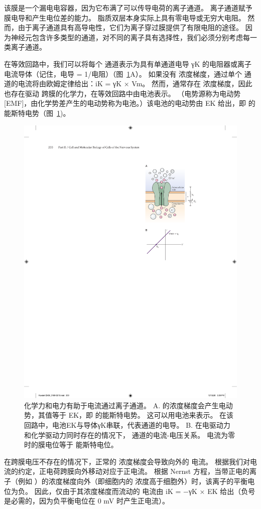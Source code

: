 该膜是一个漏电电容器，因为它布满了可以传导电荷的离子通道。
离子通道赋予膜电导和产生电位差的能力。
脂质双层本身实际上具有零电导或无穷大电阻。
然而，由于离子通道具有高导电性，它们为离子穿过膜提供了有限电阻的途径。
因为神经元包含许多类型的通道，对不同的离子具有选择性，我们必须分别考虑每一类离子通道。


在等效回路中，我们可以将每个  通道表示为具有单通道电导 γK 的电阻器或离子电流导体（记住，电导 = 1/电阻）（图~\ref{fig:9_6}A）。 
如果没有  浓度梯度，通过单个  通道的电流将由欧姆定律给出：iK = γK × Vm。
然而，通常存在  浓度梯度，因此也存在驱动  跨膜的化学力，在等效回路中由电池表示。
（电势源称为电动势 [EMF]，由化学势差产生的电动势称为电池。）该电池的电动势由 EK 给出，即  的能斯特电势（图~\ref{fig:9_6})。


\begin{figure}[htbp]
	\centering
	\includegraphics[width=0.5\linewidth]{chap09/fig_9_6}
	\caption{化学力和电力有助于电流通过离子通道。 A.  的浓度梯度会产生电动势，其值等于 EK，即  的能斯特电势。 这可以用电池来表示。 在该回路中，电池EK与导体γK串联，代表通道的电导。 B. 在电驱动力和化学驱动力同时存在的情况下， 通道的电流-电压关系。 电流为零时的膜电位等于  能斯特电位。}
	\label{fig:9_6}
\end{figure}


在跨膜电压不存在的情况下，正常的  浓度梯度会导致向外的  电流。
根据我们对电流的约定，正电荷跨膜向外移动对应于正电流。
根据 Nernst 方程，当带正电的离子（例如 ）的浓度梯度向外（即细胞内的  浓度高于细胞外）时，该离子的平衡电位为负。
因此，仅由于其浓度梯度而流动的  电流由 iK = −γK × EK 给出（负号是必需的，因为负平衡电位在 0 mV 时产生正电流）。


